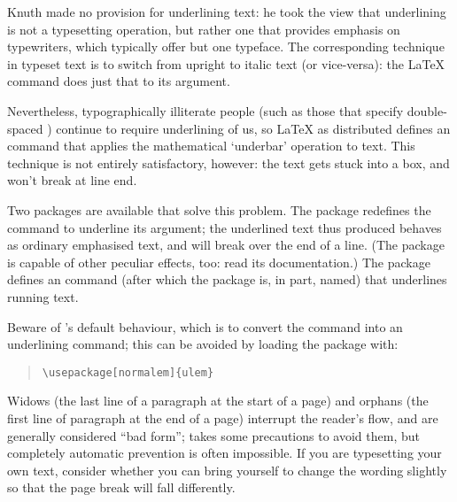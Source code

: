 Knuth made no provision for underlining text: he took the view that
underlining is not a typesetting operation, but rather one that
provides emphasis on typewriters, which typically offer but one
typeface.  The corresponding technique in typeset text is to switch
from upright to italic text (or vice-versa): the \LaTeX{} command
 does just that to its argument.

Nevertheless, typographically illiterate people (such as those that
specify double-spaced
)
continue to require underlining of us, so \LaTeX{} as distributed
defines an  command that applies the mathematical
`underbar' operation to text.  This technique is not entirely
satisfactory, however: the text gets stuck into a box, and won't break
at line end.

Two packages are available that solve this problem.  The
 package redefines the
 command to underline its argument; the underlined text thus
produced behaves as ordinary emphasised text, and will break over the
end of a line.  (The package is capable of other peculiar effects,
too: read its documentation.)
The  package defines an  command (after which the
package is, in part, named) that underlines running text.

Beware of 's default behaviour, which is to convert the
 command into an underlining command; this can be avoided by
loading the package with:
\begin{quote}
\begin{verbatim}
\usepackage[normalem]{ulem}
\end{verbatim}
\end{quote}
\begin{ctanrefs}
\item[ulem.sty]
\item[soul.sty]
\end{ctanrefs}


Widows (the last line of a paragraph at the start of a page) and
orphans (the first line of paragraph at the end of a page) interrupt
the reader's flow, and are generally considered ``bad form'';
\AllTeX{} takes some precautions to avoid them, but completely
automatic prevention is often impossible.  If you are typesetting your
own text, consider whether you can bring yourself to change the
wording slightly so that the page break will fall differently.

